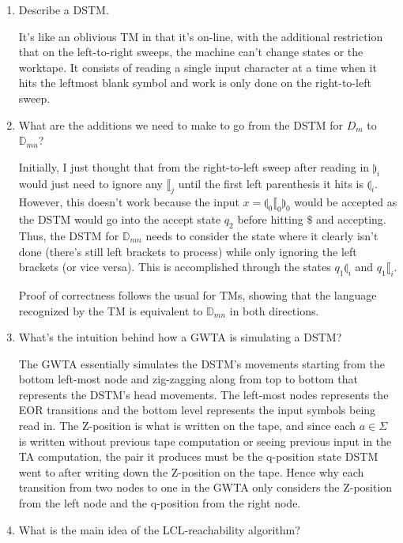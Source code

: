 \documentclass[11pt]{article}
\begin{document}
\begin{enumerate}
  \item Describe a DSTM.

  It's like an oblivious TM in that it's on-line, with the additional restriction that on the left-to-right sweeps, the machine can't change states or the worktape. It consists of reading a single input character at a time when it hits the leftmost blank symbol and work is only done on the right-to-left sweep.

  \item What are the additions we need to make to go from the DSTM for $D_m$ to $\mathbb{D}_{mn}$?

  Initially, I just thought that from the right-to-left sweep after reading in $\rrparenthesis_i$ would just need to ignore any $\llbracket_j$ until the first left parenthesis it hits is $\llparenthesis_i$. However, this doesn't work because the input $x=\llparenthesis_0 \llbracket_0 \rrparenthesis_0$ would be accepted as the DSTM would go into the accept state $q_2$ before hitting $\$$ and accepting. Thus, the DSTM for $\mathbb{D}_{mn}$ needs to consider the state where it clearly isn't done (there's still left brackets to process) while only ignoring the left brackets (or vice versa). This is accomplished through the states $q_1 \llparenthesis_i$ and $q_1 \llbracket_i$.

  Proof of correctness follows the usual for TMs, showing that the language recognized by the TM is equivalent to $\mathbb{D}_{mn}$ in both directions.

  \item What's the intuition behind how a GWTA is simulating a DSTM?

  The GWTA essentially simulates the DSTM's movements starting from the bottom left-most node and zig-zagging along from top to bottom that represents the DSTM's head movements. The left-most nodes represents the EOR transitions and the bottom level represents the input symbols being read in. The Z-position is what is written on the tape, and since each $a\in\Sigma$ is written without previous tape computation or seeing previous input in the TA computation, the pair it produces must be the q-position state DSTM went to after writing down the Z-position on the tape. Hence why each transition from two nodes to one in the GWTA only considers the Z-position from the left node and the q-position from the right node.

  \item What is the main idea of the LCL-reachability algorithm?


\end{enumerate}
\end{document}
